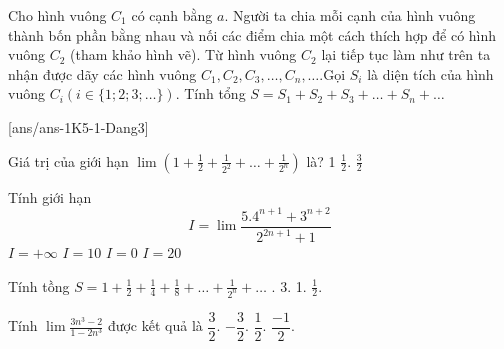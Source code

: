 \begin{bt}%
	Cho hình vuông $C_1$ có cạnh bằng $a$. Người ta chia mỗi cạnh của hình vuông thành bốn phần bằng nhau và nối các điểm chia một cách thích hợp để có hình vuông $C_2$ (tham khảo hình vẽ).
	Từ hình vuông $C_2$ lại tiếp tục làm như trên ta nhận được dãy các hình vuông $C_1, C_2, C_3, \ldots, C_n, \ldots$.Gọi $S_i$ là diện tích của hình vuông $C_i(i \in\{1 ; 2 ; 3 ; \ldots\})$. Tính tổng $S=S_1+S_2+S_3+\ldots+S_n+\ldots$
\end{bt} 
\centerline{}
[ans/ans-1K5-1-Dang3]
\begin{ex}%
	Giá trị của giới hạn $\lim \left(1+\frac{1}{2}+\frac{1}{2^2}+\ldots+\frac{1}{2^n}\right)$ là?
\choice
{1}
{} 
{$\frac{1}{2}$.}
{$\frac{3}{2}$}
\end{ex}
\begin{ex}%
	Tính giới hạn
	$$	I=\lim \frac{5.4^{n+1}+3^{n+2}}{2^{2 n+1}+1}$$
\choice
{$I=+\infty$}
{\True $I=10$}
{$I=0$}
{$I=20$}
\end{ex}

\begin{ex}%
	Tính tồng $S=1+\frac{1}{2}+\frac{1}{4}+\frac{1}{8}+\ldots+\frac{1}{2^n}+\ldots$
\choice
{.}
{3.}
{1.}
{$\frac{1}{2}$.}
\end{ex}
\begin{ex}%
	Tính $\lim \frac{3 n^3-2}{1-2 n^3}$ được kết quả là
\choice
{$\dfrac{3}{2}$.}
{\True $-\dfrac{3}{2}$.}
{$\dfrac{1}{2}$.}
{$\dfrac{-1}{2}$.}
\end{ex}

